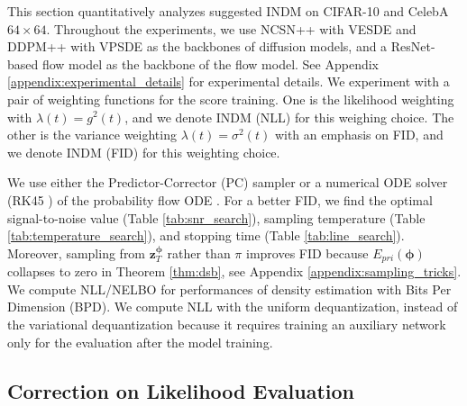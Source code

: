 \documentclass{article}
\theoremstyle{definition}
\theoremstyle{remark}
\begin{document}
	This section quantitatively analyzes suggested INDM on CIFAR-10 and CelebA $64\times 64$. Throughout the experiments, we use NCSN++ with VESDE and DDPM++ with VPSDE \cite{song2020score} as the backbones of diffusion models, and a ResNet-based flow model \citep{chen2019residual, ma2020decoupling} as the backbone of the flow model. See Appendix \ref{appendix:experimental_details} for experimental details. We experiment with a pair of weighting functions for the score training. One is the likelihood weighting \cite{song2021maximum} with $\lambda(t)=g^{2}(t)$, and we denote INDM (NLL) for this weighing choice. The other is the variance weighting \cite{ho2020denoising} $\lambda(t)=\sigma^{2}(t)$ with an emphasis on FID, and we denote INDM (FID) for this weighting choice. 
	
	We use either the Predictor-Corrector (PC) sampler \cite{song2020score} or a numerical ODE solver (RK45 \cite{dormand1980family}) of the probability flow ODE \cite{song2020score}. For a better FID, we find the optimal signal-to-noise value (Table \ref{tab:snr_search}), sampling temperature (Table \ref{tab:temperature_search}), and stopping time (Table \ref{tab:line_search}). Moreover, sampling from $\mathbf{z}_{T}^{\bm{\phi}}$ rather than $\pi$ improves FID because $E_{pri}(\bm{\phi})$ collapses to zero in Theorem \ref{thm:dsb}, see Appendix \ref{appendix:sampling_tricks}. We compute NLL/NELBO for performances of density estimation with Bits Per Dimension (BPD). We compute NLL with the uniform dequantization, instead of the variational dequantization \cite{ho2019flow++} because it requires training an auxiliary network \cite{song2021maximum} only for the evaluation after the model training.
	
	\subsection{Correction on Likelihood Evaluation}
	
\end{document}
